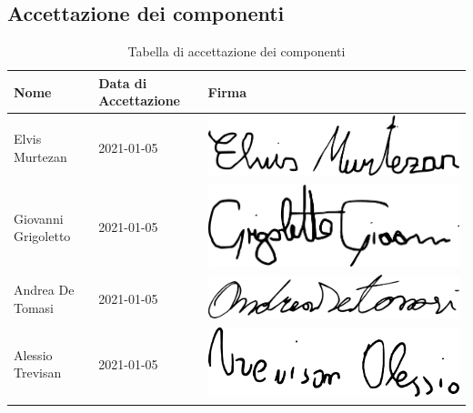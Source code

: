\subsection{Accettazione dei componenti}
{
	\renewcommand{\arraystretch}{2}
	\begin{longtable}{ C{5cm} C{3.4cm} C{5cm} }
		\caption{Tabella di accettazione dei componenti}\\
		\rowcolor{\primaryColor}
		\textcolor{\secondaryColor}{\textbf{Nome}} & \textcolor{\secondaryColor}{\textbf{Data di Accettazione}} & \textcolor{\secondaryColor}{\textbf{Firma}}\\	\endhead
		{Elvis Murtezan} & 2021-01-05 & \includegraphics[scale=0.20]{./src/Organigramma/immagini/firme/Elvis.png}\\
		{Giovanni Grigoletto} & 2021-01-05 & \includegraphics[scale=0.20]{./src/Organigramma/immagini/firme/giovanni.png}\\
		{Andrea De Tomasi} & 2021-01-05 & \includegraphics[scale=0.20]{./src/Organigramma/immagini/firme/andrea.png}\\
		{Alessio Trevisan} & 2021-01-05 & \includegraphics[scale=0.20]{./src/Organigramma/immagini/firme/alessio.png}\\

\end{longtable}}

